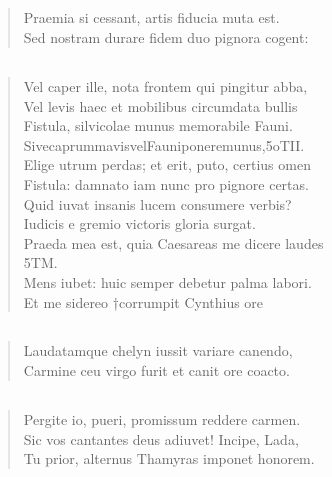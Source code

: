 \documentclass[11pt, a4paper]{report}
\begin{document}
            \subsection*{}
      \begin{verse}
      Praemia si cessant, artis fiducia muta est. \\ Sed nostram durare fidem duo pignora cogent: \\ 
      \end{verse}
  
            \subsection*{}
      \begin{verse}
      Vel caper ille, nota frontem qui pingitur abba, \\ Vel levis haec et mobilibus circumdata bullis \\ Fistula, silvicolae munus memorabile Fauni. \\ SivecaprummavisvelFauniponeremunus,5oTII. \\ Elige utrum perdas; et erit, puto, certius omen \\ Fistula: damnato iam nunc pro pignore certas. \\ Quid iuvat insanis lucem consumere verbis? \\ Iudicis e gremio victoris gloria surgat. \\ Praeda mea est, quia Caesareas me dicere laudes \\ 5TM. \\ Mens iubet: huic semper debetur palma labori. \\ Et me sidereo †corrumpit Cynthius ore \\ 
      \end{verse}
  
            \subsection*{}
      \begin{verse}
      Laudatamque chelyn iussit variare canendo, \\ Carmine ceu virgo furit et canit ore coacto. \\ 
      \end{verse}
  
            \subsection*{}
      \begin{verse}
      Pergite io, pueri, promissum reddere carmen. \\ Sic vos cantantes deus adiuvet! Incipe, Lada, \\ Tu prior, alternus Thamyras imponet honorem. \\ 
      \end{verse}
  
\end{document}
